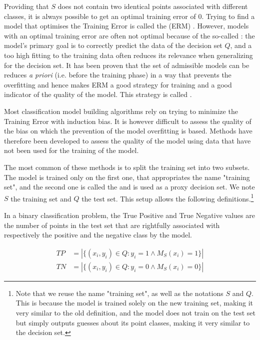 Providing that $S$ does not contain two identical points associated with different classes, it is always possible to get an optimal training error of $0$. Trying to find a model that optimises the Training Error is called the  (ERM) \cite{shalev-shwartz2014_UnderstandingMachineLearning}. However, models with an optimal training error are often not optimal because of the so-called : the model's primary goal is to correctly predict the data of the decision set $Q$, and a too high fitting to the training data often reduces its relevance when generalizing for the decision set. It has been proven that the set of admissible models can be reduces \textit{a priori} (i.e. before the training phase) in a way that prevents the overfitting and hence makes ERM a good strategy for training and a good indicator of the quality of the model. This strategy is called  \cite{shalev-shwartz2014_UnderstandingMachineLearning}.

Most classification model building algorithms rely on trying to minimize the Training Error with induction bias. It is however difficult to assess the quality of the bias on which the prevention of the model overfitting is based. Methods have therefore been developed to assess the quality of the model using data that have not been used for the training of the model.

The most common of these methods is to split the training set into two subsets. The model is trained only on the first one, that appropriates the name "training set", and the second one is called the  and is used as a proxy decision set. We note $S$ the training set and $Q$ the test set. This setup allows the following definitions.\footnote{Note that we reuse the name "training set", as well as the notations $S$ and $Q$. This is because the model is trained solely on the new training set, making it very similar to the old definition, and the model does not train on the test set but simply outputs guesses about its point classes, making it very similar to the decision set.}

\begin{definition}
In a binary classification problem, the True Positive and True Negative values are the number of points in the test set that are rightfully associated with respectively the positive and the negative class by the model.

\begin{equation}
    \begin{array}{ll}
         TP & = |\{(x_i, y_i)\in Q: y_i = 1 \land M_S(x_i) = 1\}| \\
         TN & = |\{(x_i, y_i)\in Q: y_i = 0 \land M_S(x_i) = 0\}|
    \end{array}
\end{equation}
\end{definition}

